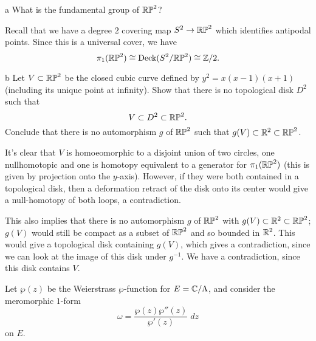 \documentclass{pset}
\begin{document}
\begin{parts}
  \begin{part}{a}
    What is the fundamental group of $\mathbb{RP}^2$?
  \end{part}

  Recall that we have a degree $2$ covering map $S^2 \to \mathbb{RP}^2$ which identifies antipodal points. Since this is a universal cover, we have
  \[
    \pi_1(\mathbb{RP}^2) \cong \textrm{Deck}(S^2/\mathbb{RP}^2) \cong \mathbb{Z}/2.
  \]

  \begin{part}{b}
    Let $V\subset \mathbb{RP}^2$ be the closed cubic curve defined by $y^2 = x(x-1)(x+1)$ (including its unique point at infinity). Show that there is no topological disk $D^2$ such that 
    \[
      V \subset D^2 \subset \mathbb{RP}^2.
    \]
    Conclude that there is no automorphism $g$ of $\mathbb{RP}^2$ such that $g(V) \subset \mathbb{R}^2\subset \mathbb{RP}^2$.
  \end{part}

  It's clear that $V$ is homoeomorphic to a disjoint union of two circles, one nullhomotopic and one is homotopy equivalent to a generator for $\pi_1(\mathbb{RP}^2)$ (this is given by projection onto the $y$-axis). However, if they were both contained in a topological disk, then a deformation retract of the disk onto its center would give a null-homotopy of both loops, a contradiction. 

  This also implies that there is no automorphism $g$ of $\mathbb{RP}^2$ with $g(V)\subset \mathbb{R}^2\subset \mathbb{RP}^2$; $g(V)$ would still be compact as a subset of $\mathbb{RP}^2$ and so bounded in $\mathbb{R}^2$. This would give a topological disk containing $g(V)$, which gives a contradiction, since we can look at the image of this disk under $g^{-1}$. We have a contradiction, since this disk contains $V$.
\end{parts}

\begin{problem}{5.12}
  Let $\wp(z)$ be the Weierstrass $\wp$-function for $E = \mathbb{C}/\Lambda$, and consider the meromorphic $1$-form
  \[
    \omega = \frac{\wp(z)\wp''(z)}{\wp'(z)}\;dz
  \]
  on $E$.
\end{problem}
\end{document}
